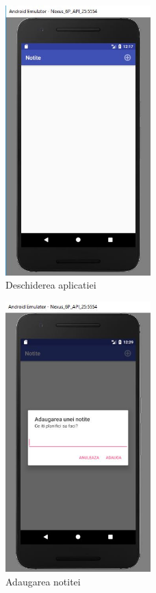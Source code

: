 \begin{figure}[!ht]
	
	\centering
	
	\includegraphics[width=0.5\textwidth]{Cattura.JPG}
	
	\caption{Deschiderea aplicatiei}
	
	\label{Im_label}
	
\end{figure}

\begin{figure}[!ht]
	
	\centering
	
	\includegraphics[width=0.5\textwidth]{Cattura1.JPG}
	
	\caption{Adaugarea notitei}
	
	\label{Im_label}
	
\end{figure}

